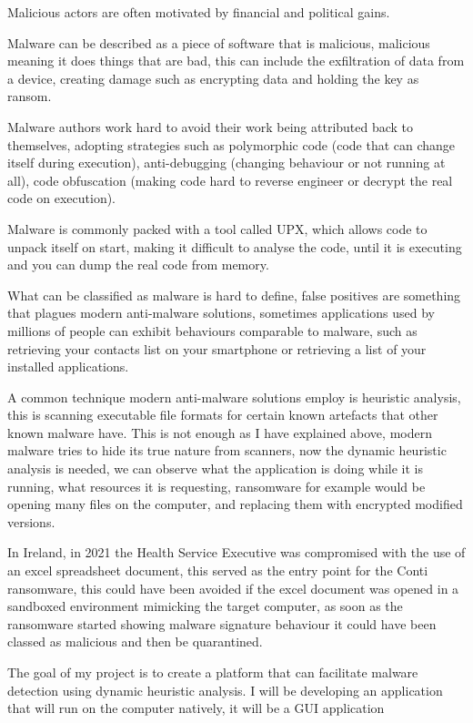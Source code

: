 
Malicious actors are often motivated by financial and political gains.

Malware can be described as a piece of software that is malicious,
malicious meaning it does things that are bad,
this can include the exfiltration of data from a device,
creating damage such as encrypting data and holding the key as ransom.

Malware authors work hard to avoid their work being attributed back to themselves,
adopting strategies such as polymorphic code (code that can change itself during execution),
anti-debugging (changing behaviour or not running at all),
code obfuscation (making code hard to reverse engineer or decrypt the real code on execution).

Malware is commonly packed with a tool called UPX, which allows code to unpack itself on start,
making it difficult to analyse the code, until it is executing and you can dump the real code from memory.

What can be classified as malware is hard to define, false positives are something that plagues modern anti-malware solutions,
sometimes applications used by millions of people can exhibit behaviours comparable to malware,
such as retrieving your contacts list on your smartphone or retrieving a list of your installed applications.

A common technique modern anti-malware solutions employ is heuristic analysis,
this is scanning executable file formats for certain known artefacts that other known malware have.
This is not enough as I have explained above, modern malware tries to hide its true nature from scanners,
now the dynamic heuristic analysis is needed, we can observe what the application is doing while it is running, what resources it is requesting,
ransomware for example would be opening many files on the computer, and replacing them with encrypted modified versions.

In Ireland, in 2021 the Health Service Executive was compromised with the use of an excel spreadsheet document,
this served as the entry point for the Conti ransomware, this could have been avoided if the excel document was opened in a sandboxed environment mimicking the target computer,
as soon as the ransomware started showing malware signature behaviour it could have been classed as malicious and then be quarantined.

The goal of my project is to create a platform that can facilitate malware detection using dynamic heuristic analysis.
I will be developing an application that will run on the computer natively, it will be a GUI application

